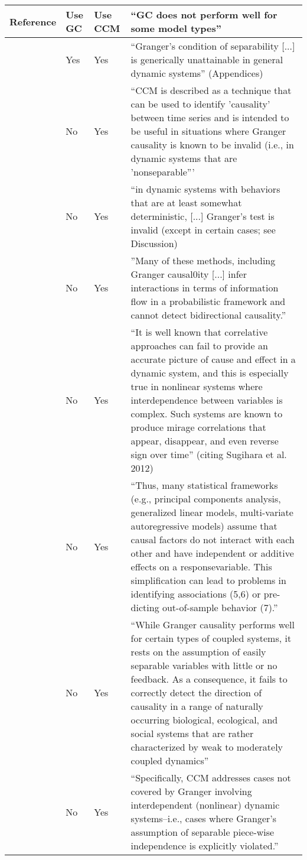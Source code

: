 \documentclass[a4paper,10pt]{article}
\begin{document}
\begin{table}
\centering
 \begin{tabular}{p{1.5cm}p{0.75cm}p{0.75cm}p{12cm}}
 Reference & Use GC & Use CCM & ``GC does not perform well for some model types'' \\ \hline 
  \citet{sugihara2012detecting} & Yes & Yes & ``Granger's condition of separability [...] is generically unattainable in general dynamic systems''  (Appendices)\\
  \citet{mccracken2014convergent} & No & Yes & ``CCM is described as a technique that can be used to identify 'causality' between time series and is intended to be useful in situations where Granger causality is known to be invalid (i.e., in dynamic systems that are 'nonseparable'''\\
  \citet{ye2015distinguishing} & No & Yes & ``in dynamic systems with behaviors that are at least somewhat deterministic, [...] Granger’s test is invalid (except in certain cases; see Discussion)\\
  \cite{cobey2016limits} & No & Yes & ''Many of these methods, including Granger causal0ity [...] infer interactions in terms of information flow in a probabilistic framework and cannot detect bidirectional causality.''\\
  \citet{deyle2016global} & No & Yes& ``It is well known that correlative approaches can fail to provide an accurate picture of cause and effect in a dynamic system, and this is especially true in nonlinear
systems where interdependence between variables is complex. Such systems are known to produce mirage correlations that appear, disappear, and even reverse sign over time'' (citing Sugihara et al. 2012) \\
  \citet{ye2016information} & No & Yes & ``Thus, many statistical frameworks (e.g., principal components analysis, generalized linear models, multi-variate autoregressive models) assume that causal factors do not interact with each other and have independent or additive effects on a responsevariable. This simplification can lead to problems in identifying associations (5,6) or pre-dicting out-of-sample behavior (7).''\\
  \citet{monster2017causal} & No & Yes & ``While Granger causality performs well for certain types of coupled systems, it rests on the assumption of easily separable variables with little or no feedback. As a consequence, it fails to correctly detect the direction of causality in a range of naturally occurring biological, ecological, and social systems that are rather characterized by weak to moderately coupled dynamics''\\
  \citet{tsonis2018convergent} & No & Yes & ``Specifically, CCM addresses cases not covered by Granger  involving  interdependent  (nonlinear)  dynamic  systems–i.e.,  cases  where Granger’s assumption of separable piece-wise independence is explicitly violated.''\\
 \end{tabular}

\end{table}



\end{document}
